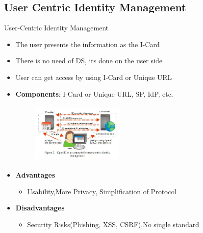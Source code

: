 \documentclass[xcolor=dvipsnames]{beamer}
\begin{document}
\subsection{User Centric Identity Management}
\begin{frame}{User-Centric Identity Management}
\begin{itemize}
\item The user presents the information as the I-Card
\item There is no need of DS, its done on the user side
\item User can get access by using I-Card or Unique URL
\item \textbf{Components}: I-Card or Unique URL, SP, IdP, etc.
\begin{figure}
\includegraphics[width=4.5cm,height=3cm]{ucidm}
\end{figure}
\item \textbf{Advantages}
\begin{itemize}
	\item Usability,More Privacy, Simplification of Protocol
\end{itemize}
\item \textbf{Disadvantages}
\begin{itemize}
	\item Security Risks(Phishing, XSS, CSRF),No single standard 
\end{itemize}
\end{itemize}
\end{frame}
\end{document}
